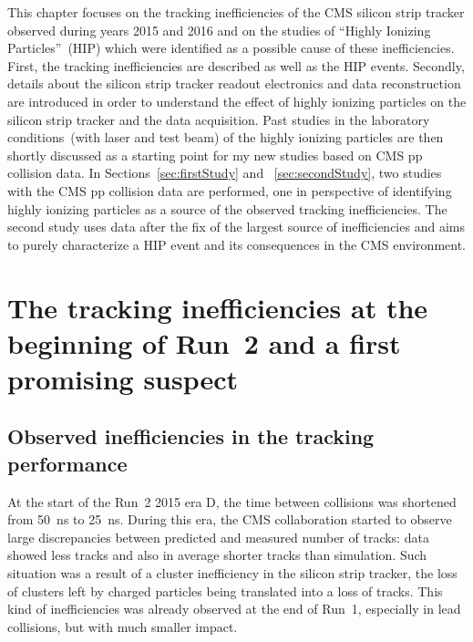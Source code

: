 
\clearpage

\setcounter{secnumdepth}{4}
\setcounter{secnumdepth}{4}

This chapter focuses on the tracking inefficiencies of the CMS silicon strip tracker observed during years 2015 and 2016 and  on the studies of ``Highly Ionizing Particles''~(HIP) which were identified as a possible cause of these inefficiencies. First, the tracking inefficiencies are described as well as the HIP events. Secondly, details about the silicon strip tracker readout electronics and data reconstruction are introduced in order to understand the effect of highly ionizing particles on the silicon strip tracker and the data acquisition. Past studies in the laboratory conditions~(with laser and test beam) of the highly ionizing particles are then shortly discussed as a starting point for my new studies based on CMS pp collision data. In Sections~\ref{sec:firstStudy} and ~\ref{sec:secondStudy}, two studies with the CMS pp collision data are performed, one in perspective of identifying highly ionizing particles as a source of the observed tracking inefficiencies. The second study uses data after the fix of the largest source of inefficiencies and aims to purely characterize a HIP event and its consequences in the CMS environment.

\section{The tracking inefficiencies at the beginning of Run~2 and a first promising suspect~\label{sec:hitIneff}}

\subsection{Observed inefficiencies in the tracking performance}

At the start of the Run~2 2015 era D, the time between collisions was shortened from 50~ns to 25~ns. During this era, the CMS collaboration started to observe large discrepancies between predicted and measured number of tracks: data showed less tracks and also in average shorter tracks than simulation. Such situation was a result of a cluster inefficiency in the silicon strip tracker, the loss of clusters left by charged particles being translated into a loss of tracks. This kind of inefficiencies was already observed at the end of Run~1, especially in lead collisions, but with much smaller impact. 

